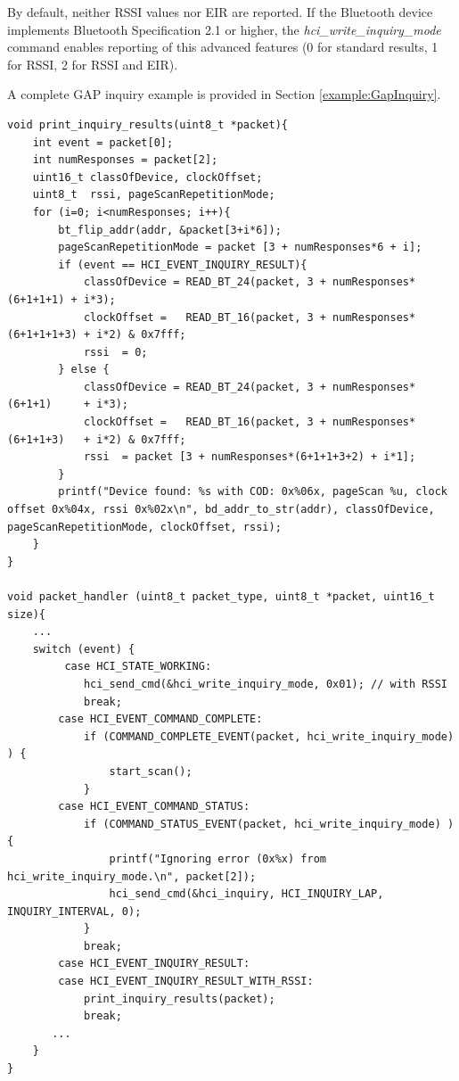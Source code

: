 \documentclass[a4paper,titlepage,oneside,12pt]{amsart} %
\begin{document}
By default, neither RSSI values nor EIR are reported. If the Bluetooth device implements Bluetooth Specification 2.1 or higher, the \emph{hci\_write\_inquiry\_mode} command enables reporting of this advanced features (0 for standard results, 1 for RSSI, 2 for RSSI and EIR). 

A complete GAP inquiry example is provided in Section \ref{example:GapInquiry}.

\begin{lstlisting}[float, caption=Discovering remote Bluetooth devices., label=DiscoverDevices]
void print_inquiry_results(uint8_t *packet){
    int event = packet[0];
    int numResponses = packet[2];
    uint16_t classOfDevice, clockOffset;
    uint8_t  rssi, pageScanRepetitionMode;
    for (i=0; i<numResponses; i++){
        bt_flip_addr(addr, &packet[3+i*6]);
        pageScanRepetitionMode = packet [3 + numResponses*6 + i];
        if (event == HCI_EVENT_INQUIRY_RESULT){
            classOfDevice = READ_BT_24(packet, 3 + numResponses*(6+1+1+1) + i*3);
            clockOffset =   READ_BT_16(packet, 3 + numResponses*(6+1+1+1+3) + i*2) & 0x7fff;
            rssi  = 0;
        } else {
            classOfDevice = READ_BT_24(packet, 3 + numResponses*(6+1+1)     + i*3);
            clockOffset =   READ_BT_16(packet, 3 + numResponses*(6+1+1+3)   + i*2) & 0x7fff;
            rssi  = packet [3 + numResponses*(6+1+1+3+2) + i*1];
        }
        printf("Device found: %s with COD: 0x%06x, pageScan %u, clock offset 0x%04x, rssi 0x%02x\n", bd_addr_to_str(addr), classOfDevice, pageScanRepetitionMode, clockOffset, rssi);
    }
}

void packet_handler (uint8_t packet_type, uint8_t *packet, uint16_t size){
    ...
    switch (event) {
         case HCI_STATE_WORKING:
            hci_send_cmd(&hci_write_inquiry_mode, 0x01); // with RSSI
            break;
        case HCI_EVENT_COMMAND_COMPLETE:
            if (COMMAND_COMPLETE_EVENT(packet, hci_write_inquiry_mode) ) {
                start_scan();
            }
        case HCI_EVENT_COMMAND_STATUS:
            if (COMMAND_STATUS_EVENT(packet, hci_write_inquiry_mode) ) {
                printf("Ignoring error (0x%x) from hci_write_inquiry_mode.\n", packet[2]);
                hci_send_cmd(&hci_inquiry, HCI_INQUIRY_LAP, INQUIRY_INTERVAL, 0);
            }
            break;
        case HCI_EVENT_INQUIRY_RESULT:
        case HCI_EVENT_INQUIRY_RESULT_WITH_RSSI:
            print_inquiry_results(packet);
            break;
       ...
    }
}
\end{lstlisting}
\end{document}
